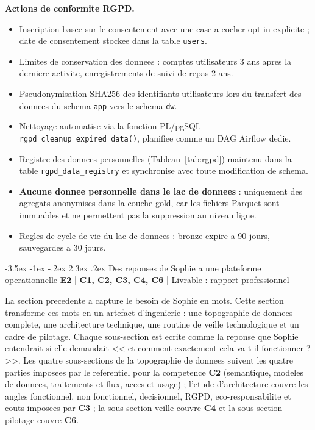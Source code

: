 \documentclass[a4paper,11pt,oneside,openany]{report}
\makeatletter
\renewcommand\section{\@startsection{section}{1}{\z@}%
  {-3.5ex \@plus -1ex \@minus -.2ex}%
  {2.3ex \@plus.2ex}%
  {\normalfont\Large\bfseries\color{ntgreen}}}
\newcommand{\competence}[1]{\textbf{\textcolor{ntgreen}{#1}}}
\newcommand{\evaluation}[1]{\textbf{\textcolor{ntblue}{#1}}}
\newcommand{\rgpd}{RGPD}
\makeatother
\begin{document}
\textbf{Actions de conformite \rgpd{}.}
\begin{itemize}[nosep]
  \item Inscription basee sur le consentement avec une case a cocher
        opt-in explicite ; date de consentement stockee dans la table
        \texttt{users}.
  \item Limites de conservation des donnees : comptes utilisateurs
        3 ans apres la derniere activite, enregistrements de suivi
        de repas 2 ans.
  \item Pseudonymisation SHA256 des identifiants utilisateurs lors du
        transfert des donnees du schema \texttt{app} vers le schema
        \texttt{dw}.
  \item Nettoyage automatise via la fonction PL/pgSQL
        \texttt{rgpd\_cleanup\_expired\_data()}, planifiee comme un
        DAG Airflow dedie.
  \item Registre des donnees personnelles (Tableau~\ref{tab:rgpd})
        maintenu dans la table \texttt{rgpd\_data\_registry} et
        synchronise avec toute modification de schema.
  \item \textbf{Aucune donnee personnelle dans le lac de donnees} :
        uniquement des agregats anonymises dans la couche gold, car
        les fichiers Parquet sont immuables et ne permettent pas la
        suppression au niveau ligne.
  \item Regles de cycle de vie du lac de donnees : bronze expire a
        90 jours, sauvegardes a 30 jours.
\end{itemize}


\section{Des reponses de Sophie a une plateforme operationnelle}
\label{sec:e2}
{\small\evaluation{E2} | \competence{C1, C2, C3, C4, C6} |
Livrable : rapport professionnel}

La section precedente a capture le besoin de Sophie en mots. Cette
section transforme ces mots en un artefact d'ingenierie : une
topographie de donnees complete, une architecture technique, une
routine de veille technologique et un cadre de pilotage. Chaque
sous-section est ecrite comme la reponse que Sophie entendrait si elle
demandait << et comment exactement cela va-t-il fonctionner ? >>.
Les quatre sous-sections de la topographie de donnees suivent les
quatre parties imposees par le referentiel pour la competence
\competence{C2} (semantique, modeles de donnees, traitements et flux,
acces et usage) ; l'etude d'architecture couvre les angles fonctionnel,
non fonctionnel, decisionnel, \rgpd{}, eco-responsabilite et couts
imposees par \competence{C3} ; la sous-section veille couvre
\competence{C4} et la sous-section pilotage couvre \competence{C6}.
\end{document}
